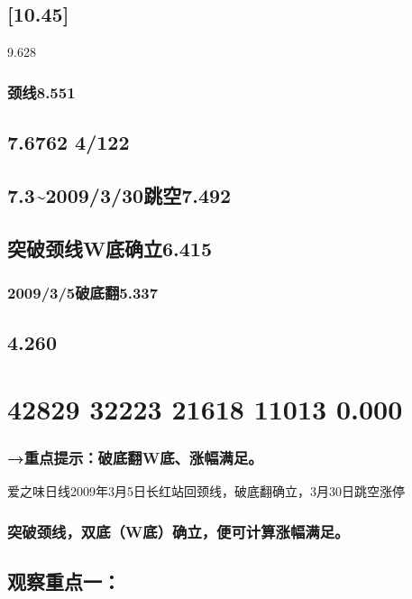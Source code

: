 \documentclass{article}
\begin{document}
\subsection{[10.45]}

9.628

\subsubsection{颈线8.551}

\subsection{7.6762 4/122}

\subsection{7.3\textasciitilde{}2009/3/30跳空7.492}

\subsection{突破颈线W底确立6.415}

\subsubsection{2009/3/5破底翻5.337}

\subsection{4.260}

\section{42829 32223 21618 11013 0.000}

\subsubsection{→重点提示：破底翻W底、涨幅满足。}

爱之味日线2009年3月5日长红站回颈线，破底翻确立，3月30日跳空涨停

\subsubsection{突破颈线，双底（W底）确立，便可计算涨幅满足。}

\subsection{观察重点一：}
\end{document}
